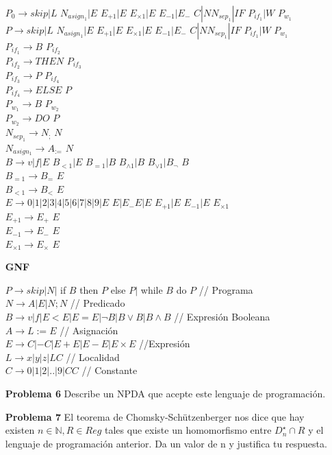 \documentclass{article}
\begin{document}
\begin{enumerate}
$P_{0} \rightarrow skip |L$ $N_{asign_1}|E$ $E_{+1}|E$ $E_{\times1}|E$ $E_{-1}|E_{-}$ $C|N N_{sep_1}| IF$ $P_{if_1} |W$ $P_{w_1}$\\
$P \rightarrow skip |L$ $N_{asign_1}|E$ $E_{+1}|E$ $E_{\times1}|E$ $E_{-1}|E_{-}$ $C|N N_{sep_1}| IF$ $P_{if_1} |W$ $P_{w_1}$\\
$P_{if_1} \rightarrow B$ $P_{if_2}$\\
$P_{if_2} \rightarrow THEN$ $P_{if_3}$\\
$P_{if_3} \rightarrow P$ $P_{if_4}$\\
$P_{if_4} \rightarrow ELSE$ $P$\\
$P_{w_1} \rightarrow B$ $P_{w_2}$\\
$P_{w_2} \rightarrow DO$ $P$\\
$N_{sep_1}  \rightarrow N_{;}$ $N$\\
$N_{asign_1} \rightarrow A_{:=}$ $N$\\
$B \rightarrow v|f| E$ $B_{<1} | E$ $B_{=1} | B$ $B_{\wedge 1} | B$  $B_{\vee 1} | B_{\neg}$ $B $\\
$B_{=1} \rightarrow B_{=}$ $E$\\
$B_{<1} \rightarrow B_{<}$ $E$\\
$E \rightarrow 0|1|2|3|4|5|6|7|8|9|E$ $E|E_{-} E|E$ $E_{+1}|E$ $E_{-1}|E$ $E_{\times1}$\\
$E_{+1} \rightarrow E_{+}$ $E$\\
$E_{-1} \rightarrow E_{-}$ $E$\\
$E_{\times1} \rightarrow E_{\times}$ $E$\\


\item[\bf{GNF}]

$P \rightarrow skip |N|$ if $B$ then $P$ else $P |$ while $B$ do $P$   // Programa\\ 
$N \rightarrow A|E|N;N$ // Predicado\\
$B \rightarrow v|f|E<E|E=E|\neg B |B \vee B| B \wedge B $ // Expresión Booleana\\
$A \rightarrow L:=E$ // Asignación\\
$E \rightarrow C|-C|E+E|E-E|E \times E$ //Expresión\\
$L \rightarrow x|y|z|LC$ // Localidad\\
$C \rightarrow 0|1|2|..|9|CC$ // Constante




\item[\bf{Problema 6}]  Describe un NPDA que acepte este lenguaje de programación.
\item[\bf{Problema 7}]  El teorema de Chomsky-Schützenberger nos dice que hay existen $n \in \mathbb{N}, R \in Reg$ tales que existe un homomorfismo entre $D^{\star}_n \cap R$ y el lenguaje de programación anterior. Da un valor de n y justifica tu respuesta.




\end{enumerate}
\end{document}
